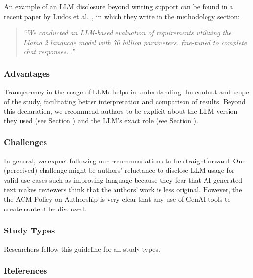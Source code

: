 An example of an LLM disclosure beyond writing support can be found in a recent paper by Ludos et al.~\cite{DBLP:conf/re/LubosFTGMEL24}, in which they write in the methodology section:

\begin{quote}
\it
``We conducted an LLM-based evaluation of requirements utilizing the Llama 2 language model with 70 billion parameters, fine-tuned to complete chat responses...''
\end{quote}


\subsubsection{Advantages}

Transparency in the usage of LLMs helps in understanding the context and scope of the study, facilitating better interpretation and comparison of results.
Beyond this declaration, we recommend authors to be explicit about the LLM version they used (see Section \modelversion) and the LLM's exact role (see Section \toolarchitecture).


\subsubsection{Challenges}

In general, we expect following our recommendations to be straightforward.
One (perceived) challenge might be authors' reluctance to disclose LLM usage for valid use cases such as improving language because they fear that AI-generated text makes reviewers think that the authors' work is less original.
However, the the ACM Policy on Authorship is very clear that any use of GenAI tools to create content \must be disclosed.


\subsubsection{Study Types}

Researchers \must follow this guideline for all study types.


\subsubsection{References}





